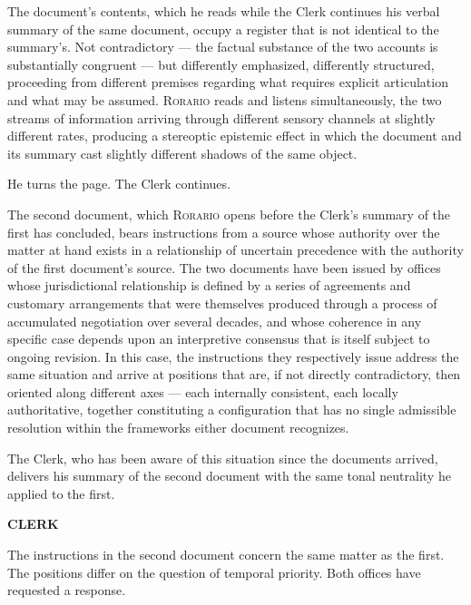\documentclass[12pt, oneside]{article}
\newenvironment{action}{%
  \vspace{0.6em}%
  \noindent\ignorespaces%
}{%
  \par\vspace{0.6em}%
}
\newcommand{\character}[1]{%
  \vspace{0.8em}%
  \begin{center}%
    \bfseries\MakeUppercase{#1}%
  \end{center}%
  \vspace{-0.3em}%
}
\newenvironment{dialogue}{%
  \vspace{0.2em}%
  \begin{list}{}{%
    \setlength{\leftmargin}{1.2in}%
    \setlength{\rightmargin}{0.8in}%
    \setlength{\itemsep}{0.6em}%
    \setlength{\parsep}{0pt}%
  }%
}{%
  \end{list}%
  \vspace{0.4em}%
}
\newcommand{\says}[2]{%
  \character{#1}%
  \begin{dialogue}\item #2\end{dialogue}%
}
\begin{document}
\begin{action}
The document's contents, which he reads while the Clerk continues his verbal summary of the same document, occupy a register that is not identical to the summary's. Not contradictory --- the factual substance of the two accounts is substantially congruent --- but differently emphasized, differently structured, proceeding from different premises regarding what requires explicit articulation and what may be assumed. \textsc{Rorario} reads and listens simultaneously, the two streams of information arriving through different sensory channels at slightly different rates, producing a stereoptic epistemic effect in which the document and its summary cast slightly different shadows of the same object.

He turns the page. The Clerk continues.
\end{action}

\begin{action}
The second document, which \textsc{Rorario} opens before the Clerk's summary of the first has concluded, bears instructions from a source whose authority over the matter at hand exists in a relationship of uncertain precedence with the authority of the first document's source. The two documents have been issued by offices whose jurisdictional relationship is defined by a series of agreements and customary arrangements that were themselves produced through a process of accumulated negotiation over several decades, and whose coherence in any specific case depends upon an interpretive consensus that is itself subject to ongoing revision. In this case, the instructions they respectively issue address the same situation and arrive at positions that are, if not directly contradictory, then oriented along different axes --- each internally consistent, each locally authoritative, together constituting a configuration that has no single admissible resolution within the frameworks either document recognizes.

The Clerk, who has been aware of this situation since the documents arrived, delivers his summary of the second document with the same tonal neutrality he applied to the first.
\end{action}

\says{Clerk}{The instructions in the second document concern the same matter as the first. The positions differ on the question of temporal priority. Both offices have requested a response.}
\end{document}
